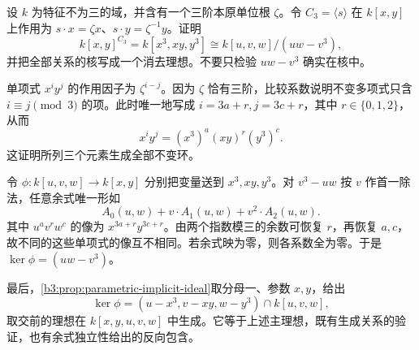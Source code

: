 \begin{exercise}\label{b3:ex:08-cubic-diagonal-invariants}
	设 \(k\) 为特征不为三的域，并含有一个三阶本原单位根 \(\zeta\)。令 \(C_3=\langle s\rangle\) 在 \(k[x,y]\) 上作用为 \(s\cdot x=\zeta x\)、\(s\cdot y=\zeta^{-1}y\)。证明
	\[
		k[x,y]^{C_3}=k[x^3,xy,y^3] \cong k[u,v,w]/(uw-v^3),
	\]
	并把全部关系的核写成一个消去理想。不要只检验 \(uw-v^3\) 确实在核中。
\end{exercise}
\begin{solution}
	单项式 \(x^iy^j\) 的作用因子为 \(\zeta^{i-j}\)。因为 \(\zeta\) 恰有三阶，比较系数说明不变多项式只含 \(i\equiv j\pmod3\) 的项。此时唯一地写成 \(i=3a+r,j=3c+r\)，其中 \(r\in\{0,1,2\}\)，从而
	\[
		x^iy^j=(x^3)^a(xy)^r(y^3)^c.
	\]
	这证明所列三个元素生成全部不变环。

	令 \(\phi:k[u,v,w]\to k[x,y]\) 分别把变量送到 \(x^3,xy,y^3\)。对 \(v^3-uw\) 按 \(v\) 作首一除法，任意余式唯一形如
	\[
		A_0(u,w)+v\cdot A_1(u,w)+v^2\cdot A_2(u,w).
	\]
	其中 \(u^av^rw^c\) 的像为 \(x^{3a+r}y^{3c+r}\)。由两个指数模三的余数可恢复 \(r\)，再恢复 \(a,c\)，故不同的这些单项式的像互不相同。若余式映为零，则各系数全为零。于是 \(\ker\phi=(uw-v^3)\)。

	最后，\cref{b3:prop:parametric-implicit-ideal}取分母一、参数 \(x,y\)，给出
	\[
		\ker\phi=(u-x^3,v-xy,w-y^3)\cap k[u,v,w],
	\]
	取交前的理想在 \(k[x,y,u,v,w]\) 中生成。它等于上述主理想，既有生成关系的验证，也有余式独立性给出的反向包含。
\end{solution}
